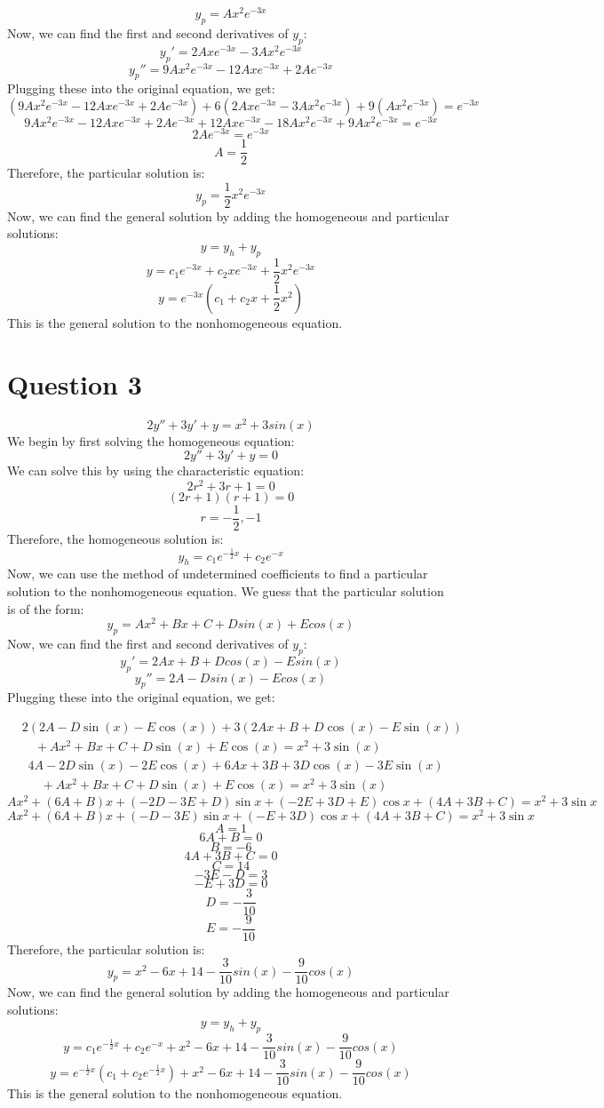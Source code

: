 \documentclass{article}
\begin{document}
\[
y_p = Ax^{2}e^{-3x}
\]
Now, we can find the first and second derivatives of $y_p$:
\[
y_p' = 2Axe^{-3x} - 3Ax^{2}e^{-3x}
\]
\[
y_p'' = 9Ax^{2}e^{-3x} - 12Axe^{-3x} + 2Ae^{-3x}
\]
Plugging these into the original equation, we get:
\[
    (9Ax^{2}e^{-3x} - 12Axe^{-3x} + 2Ae^{-3x}) + 6(2Axe^{-3x} - 3Ax^{2}e^{-3x}) + 9(Ax^{2}e^{-3x}) = e^{-3x}
\]
\[
    9Ax^{2}e^{-3x} - 12Axe^{-3x} + 2Ae^{-3x} + 12Axe^{-3x} - 18Ax^{2}e^{-3x} + 9Ax^{2}e^{-3x} = e^{-3x}
\]
\[
    2Ae^{-3x} = e^{-3x}
\]
\[
    A = \frac{1}{2}
\]
Therefore, the particular solution is:
\[
y_p = \frac{1}{2}x^{2}e^{-3x}
\]
Now, we can find the general solution by adding the homogeneous and particular solutions:
\[
y = y_h + y_p
\]
\[
y = c_1e^{-3x} + c_2xe^{-3x} + \frac{1}{2}x^{2}e^{-3x}
\]
\[
y = e^{-3x}(c_1 + c_2x + \frac{1}{2}x^{2})
\]
This is the general solution to the nonhomogeneous equation.

\section*{Question 3}
\[
2y'' + 3y' + y = x^{2} + 3sin(x)
\]
We begin by first solving the homogeneous equation:
\[
2y'' + 3y' + y = 0
\]
We can solve this by using the characteristic equation:
\[
2r^2 + 3r + 1 = 0
\]
\[
(2r + 1)(r + 1) = 0
\]
\[
r = -\frac{1}{2}, -1
\]
Therefore, the homogeneous solution is:
\[
y_h = c_1e^{-\frac{1}{2}x} + c_2e^{-x}
\]
Now, we can use the method of undetermined coefficients to find a particular solution to the nonhomogeneous equation. We guess that the particular solution is of the form:
\[
y_p = Ax^{2} + Bx + C + Dsin(x) + Ecos(x)
\]
Now, we can find the first and second derivatives of $y_p$:
\[
y_p' = 2Ax + B + Dcos(x) - Esin(x)
\]
\[
y_p'' = 2A - Dsin(x) - Ecos(x)
\]
Plugging these into the original equation, we get:

\begin{align*}
&2(2A - D\sin(x) - E\cos(x)) + 3(2Ax + B + D\cos(x) - E\sin(x)) \\
&\quad + Ax^{2} + Bx + C + D\sin(x) + E\cos(x) = x^{2} + 3\sin(x)
\end{align*}
\begin{align*}
&4A - 2D\sin(x) - 2E\cos(x) + 6Ax + 3B + 3D\cos(x) - 3E\sin(x) \\
&\quad + Ax^{2} + Bx + C + D\sin(x) + E\cos(x) = x^{2} + 3\sin(x)
\end{align*}
\[
Ax^{2}+(6A+B)x+(-2D-3E+D)\sin x+(-2E+3D+E)\cos x+(4A+3B+C)=x^{2}+3\sin x
\]
\[
Ax^{2}+(6A+B)x+(-D-3E)\sin x+(-E+3D)\cos x+(4A+3B+C)=x^{2}+3\sin x
\]
\[
A=1
\]
\[
6A+B=0
\]
\[
B=-6
\]
\[
4A+3B+C=0
\]
\[
C=14
\]
\[
-3E-D=3
\]
\[
-E+3D=0
\]
\[
D=-\frac{3}{10}
\]
\[
E=-\frac{9}{10}
\]
Therefore, the particular solution is:
\[
y_p = x^{2} - 6x + 14 - \frac{3}{10}sin(x) - \frac{9}{10}cos(x)
\]
Now, we can find the general solution by adding the homogeneous and particular solutions:
\[
y = y_h + y_p
\]
\[
y = c_1e^{-\frac{1}{2}x} + c_2e^{-x} + x^{2} - 6x + 14 - \frac{3}{10}sin(x) - \frac{9}{10}cos(x)
\]
\[
y = e^{-\frac{1}{2}x}(c_1 + c_2e^{-\frac{1}{2}x}) + x^{2} - 6x + 14 - \frac{3}{10}sin(x) - \frac{9}{10}cos(x)
\]
This is the general solution to the nonhomogeneous equation.
\end{document}
